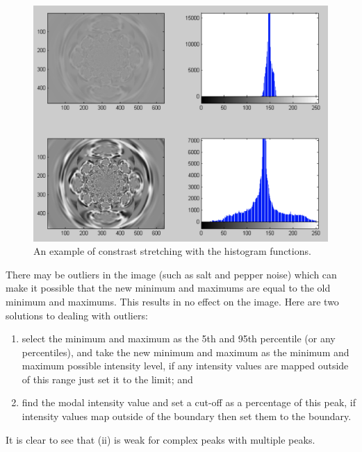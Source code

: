 \begin{figure}
    \centering
    \includegraphics[width=0.8\linewidth]{images/normalisation.png}
    \caption{An example of constrast stretching with the histogram functions.}
    \label{fig:normalisation}
\end{figure}

\begin{remark}
    There may be outliers in the image (such as salt and pepper noise) which can make it possible that the new minimum and maximums are equal to the old minimum and maximums. This results in no effect on the image. Here are two solutions to dealing with outliers:
    \begin{enumerate}
        \item select the minimum and maximum as the 5th and 95th percentile (or any percentiles), and take the new minimum and maximum as the minimum and maximum possible intensity level, if any intensity values are mapped outside of this range just set it to the limit; and
        \item find the modal intensity value and set a cut-off as a percentage of this peak, if intensity values map outside of the boundary then set them to the boundary.
    \end{enumerate}
    It is clear to see that (ii) is weak for complex peaks with multiple peaks. 
\end{remark}

